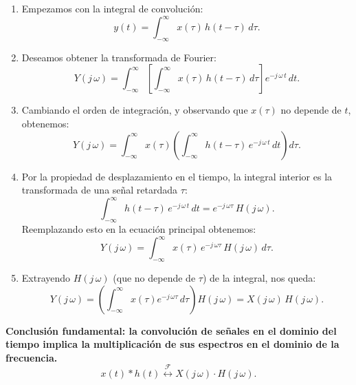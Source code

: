 \documentclass[11pt,a4paper,openany]{book}
\begin{document}
\begin{enumerate}
	\item Empezamos con la integral de convolución:
	\begin{equation}
		y(t) = \int_{-\infty}^{\infty} x(\tau) \, h(t-\tau) \, d\tau .
	\end{equation}
	\item Deseamos obtener la transformada de Fourier:
	\begin{equation}
		Y(j \, \omega) = \int_{-\infty}^{\infty} \left[ \int_{-\infty}^{\infty} x(\tau) \, h(t-\tau) \, d\tau \right] e^{-j \, \omega \, t} \, dt.
	\end{equation}
	\item Cambiando el orden de integración, y observando que $x(\tau)$ no depende de $t$, obtenemos:
	\begin{equation}
		Y(j \, \omega) = \int_{-\infty}^{\infty} x(\tau) \left( \int_{-\infty}^{\infty} h(t-\tau) \, e^{-j \, \omega \, t} \, dt \right) d\tau .
	\end{equation}
	\item Por la propiedad de desplazamiento en el tiempo, la integral interior es la transformada de una señal retardada $\tau$:
	\begin{equation}
		\int_{-\infty}^{\infty} h(t-\tau) \, e^{-j \, \omega \, t} \, dt = e^{-j \, \omega \tau} \, H(j \, \omega).
	\end{equation}
	Reemplazando esto en la ecuación principal obtenemos:
	\begin{equation}
		Y(j \, \omega) = \int_{-\infty}^{\infty} x(\tau) \, e^{-j \, \omega\tau} \, H(j \, \omega) \, d\tau .
	\end{equation}
	\item Extrayendo $H(j \, \omega)$ (que no depende de $\tau$) de la integral, nos queda:
	\begin{equation}
		Y(j \, \omega) = \left( \int_{-\infty}^{\infty} x(\tau) e^{-j \, \omega \tau} \, d\tau \right) H(j \, \omega) = X(j \, \omega) \, H(j \, \omega) .
	\end{equation}
\end{enumerate}

\textbf{Conclusión fundamental: la convolución de señales en el dominio del tiempo implica la multiplicación de sus espectros en el dominio de la frecuencia.}
\begin{equation}
	x(t) * h(t) \stackrel{\mathcal{F}}{\longleftrightarrow} X(j \, \omega) \cdot H(j \, \omega) .
\end{equation}
\end{document}
